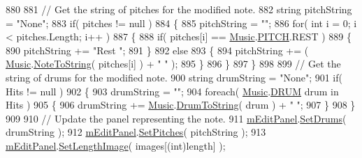 \begin{DoxyCode}
880 
881                 \textcolor{comment}{// Get the string of pitches for the modified note.}
882                 \textcolor{keywordtype}{string} pitchString = \textcolor{stringliteral}{"None"};
883                 \textcolor{keywordflow}{if}( pitches != null )
884                 \{
885                     pitchString = \textcolor{stringliteral}{""};
886                     \textcolor{keywordflow}{for}( \textcolor{keywordtype}{int} i = 0; i < pitches.Length; i++ )
887                     \{
888                         \textcolor{keywordflow}{if}( pitches[i] == \hyperlink{class_music}{Music}.\hyperlink{group___music_enums_ga508f69b199ea518f935486c990edac1d}{PITCH}.REST )
889                         \{
890                             pitchString += \textcolor{stringliteral}{"Rest "};
891                         \}
892                         \textcolor{keywordflow}{else}
893                         \{
894                             pitchString += ( \hyperlink{class_music}{Music}.\hyperlink{group___music_stat_func_ga85a22c905d56d4c5f4e62159bfecee8c}{NoteToString}( pitches[i] ) + \textcolor{stringliteral}{" "} );
895                         \}
896                     \}
897                 \}
898 
899                 \textcolor{comment}{// Get the string of drums for the modified note.}
900                 \textcolor{keywordtype}{string} drumString = \textcolor{stringliteral}{"None"};
901                 \textcolor{keywordflow}{if}( Hits != null )
902                 \{
903                     drumString = \textcolor{stringliteral}{""};
904                     \textcolor{keywordflow}{foreach}( \hyperlink{class_music}{Music}.\hyperlink{group___music_enums_gade475b4382c7066d1af13e7c13c029b6}{DRUM} drum in Hits )
905                     \{
906                         drumString += \hyperlink{class_music}{Music}.\hyperlink{group___music_stat_func_gaf5f64ebe9a7e036e07f283e41f26d22b}{DrumToString}( drum ) + \textcolor{stringliteral}{" "};
907                     \}
908                 \}
909 
910                 \textcolor{comment}{// Update the panel representing the note.}
911                 \hyperlink{group___s_c_priv_var_ga0f5cfc2d0492190ded3fbda5b43b45e4}{mEditPanel}.\hyperlink{group___s_c___n_d_p_unity_gae14b5564be204df7699b95186d83f69f}{SetDrums}( drumString );
912                 \hyperlink{group___s_c_priv_var_ga0f5cfc2d0492190ded3fbda5b43b45e4}{mEditPanel}.\hyperlink{group___s_c___n_d_p_unity_gad9bf776f0c51cf6170faccf9fc4ac7e0}{SetPitches}( pitchString );
913                 \hyperlink{group___s_c_priv_var_ga0f5cfc2d0492190ded3fbda5b43b45e4}{mEditPanel}.\hyperlink{group___s_c___n_d_p_unity_ga1a1c4b8111463ec3e134d17fe5064a54}{SetLengthImage}( images[(\textcolor{keywordtype}{int})length] );

\end{DoxyCode}
